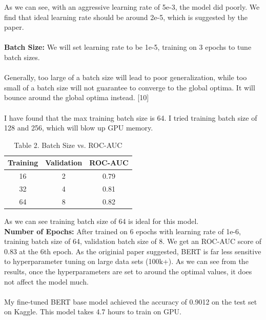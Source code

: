 \documentclass[11pt,a4paper]{article}
\begin{document}
\noindent As we can see, with an aggressive learning rate of 5e-3, the model did poorly. We find that ideal learning rate should be around 2e-5, which is suggested by the paper.\\
\\

\noindent \textbf {Batch Size:} We will set learning rate to be 1e-5, training on 3 epochs to tune batch sizes.\\
\\
Generally, too large of a batch size will lead to poor generalization, while too small of a batch size will not guarantee to converge to the global optima. It will bounce around the global optima instead. [10]\\
\\
I have found that the max training batch size is 64. I tried training batch size of 128 and 256, which will blow up GPU memory.\\

\begin{table}[!htbp]
	\centering
	\begin{tabular}{|c|c|c|}
		\hline
		{Training} & {Validation} & {ROC-AUC} \\ \hline
		16                           & 2                              & 0.79             \\ \hline
		32                           & 4                              & 0.81             \\ \hline
		64                           & 8                              & 0.82             \\ \hline
	\end{tabular}
	\caption{Table 2. Batch Size vs. ROC-AUC}
\end{table}

\noindent As we can see training batch size of 64 is ideal for this model.\\

\noindent \textbf {Number of Epochs: }  After trained on 6 epochs with learning rate of 1e-6, training batch size of 64, validation batch size of 8. We get an ROC-AUC score of 0.83 at the 6th epoch. As the originial paper suggested, BERT is far less sensitive to hyperparameter tuning on large data sets (100k+)\cite{BERT}. As we can see from the results, once the hyperparameters are set to around the optimal values, it does not affect the model much.\\
\\
\noindent My fine-tuned BERT base model achieved the accuracy of 0.9012 on the test set on Kaggle. This model takes 4.7 hours to train on GPU.\\
\end{document}
